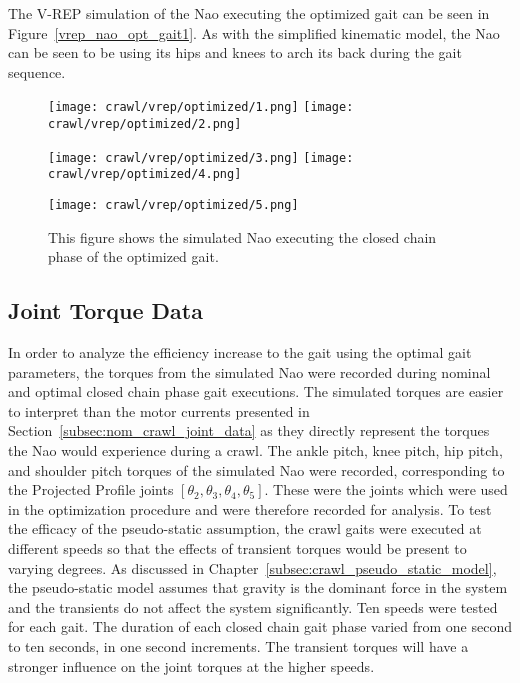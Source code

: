 The V-REP simulation of the Nao executing the optimized gait can be seen in
Figure~\ref{vrep_nao_opt_gait1}. As with the
simplified kinematic model, the Nao can be seen to be using its hips and knees to arch its back during the gait sequence.

\begin{figure}
  \centerline{
    \texttt{[image: crawl/vrep/optimized/1.png]}
    \texttt{[image: crawl/vrep/optimized/2.png]}
  }
  \centerline{
    \texttt{[image: crawl/vrep/optimized/3.png]}
    \texttt{[image: crawl/vrep/optimized/4.png]}
  }
  \centerline{
    \texttt{[image: crawl/vrep/optimized/5.png]}
  }
  \caption{This figure shows the simulated Nao executing the closed chain phase of the
           optimized gait.}
  \label{fig:vrep_nao_opt_gait1}
\end{figure}

\subsection{Joint Torque Data} \label{subsec:opt_joint_torque_data}

In order to analyze the efficiency increase to the gait using the optimal gait parameters,
the torques from the simulated Nao were recorded during nominal and optimal closed chain
phase gait executions. The simulated torques are easier to interpret than the motor currents
presented in Section~\ref{subsec:nom_crawl_joint_data} as they directly represent the torques
the Nao would experience during a crawl. The ankle pitch, knee pitch, hip pitch, and shoulder pitch
torques of the simulated Nao were recorded, corresponding to the Projected Profile joints 
$[\theta_2, \theta_3, \theta_4, \theta_5]$. These were the joints which were used in the optimization
procedure and were therefore recorded for analysis.
To test the efficacy of the pseudo-static assumption, the crawl gaits were executed at different
speeds so that the effects of transient torques would be present to varying degrees.
As discussed in Chapter~\ref{subsec:crawl_pseudo_static_model}, the pseudo-static
model assumes that gravity is the dominant force in the system and the  transients
do not affect the system significantly.
Ten speeds were tested for each gait. The duration of each closed chain gait phase varied from one second to
ten seconds, in one second increments. The transient torques will have a stronger influence
on the joint torques at the higher speeds.


